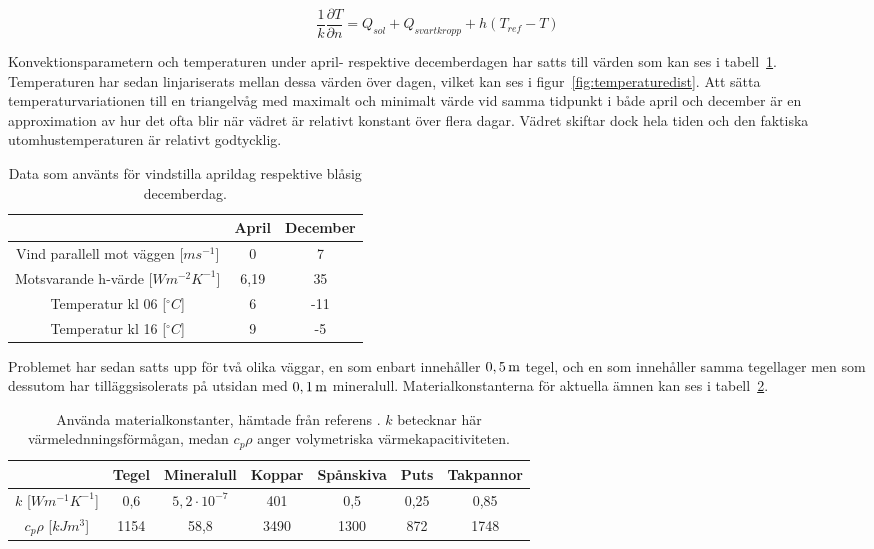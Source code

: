\begin{equation}
\label{eq:wallneumann}
\frac{1}{k}\frac{\partial T}{\partial n} = Q_{sol} + Q_{svartkropp} + h(T_{ref}-T)
\end{equation}

Konvektionsparametern och temperaturen under april- respektive decemberdagen har satts till värden som kan ses i tabell~\ref{tbl:aprdec}. Temperaturen har sedan linjariserats mellan dessa värden över dagen, vilket kan ses i figur~\ref{fig:temperaturedist}. Att sätta temperaturvariationen till en triangelvåg med maximalt och minimalt värde vid samma tidpunkt i både april och december är en approximation av hur det ofta blir när vädret är relativt konstant över flera dagar. Vädret skiftar dock hela tiden och den faktiska utomhustemperaturen är relativt godtycklig.

\begin{table}[hpbt]
\centering
\caption{Data som använts för vindstilla aprildag respektive blåsig decemberdag.}
\begin{tabular}{c|c|c}
& April & December \\
\hline
Vind parallell mot väggen [$ms^{-1}$] & 0 & 7 \\
Motsvarande h-värde [$Wm^{-2}K^{-1}$] & 6,19 & 35 \\
Temperatur kl 06 [$^{\circ}C$] & 6 & -11 \\
Temperatur kl 16 [$^{\circ}C$] & 9 & -5
\end{tabular}
\label{tbl:aprdec}
\end{table}


Problemet har sedan satts upp för två olika väggar, en som enbart innehåller $\unit[0,5]{m}$ tegel, och en som innehåller samma tegellager men som dessutom har tilläggsisolerats på utsidan med $\unit[0,1]{m}$ mineralull. Materialkonstanterna för aktuella ämnen kan ses i tabell~\ref{tbl:materialconstants}.

\begin{table}[hpbt]
\centering
\caption{Använda materialkonstanter, hämtade från referens \cite{kandidatarbete2010}\cite{engineeringtoolboxdensity}\cite{bkvthermal}\cite{engineeringtoolboxspecificheat}\cite{engineeringcom}\cite{engineeringtoolboxthermalconductivity}\cite{ozel11}. $k$ betecknar här värmelednningsförmågan, medan $c_p\rho$ anger volymetriska värmekapacitiviteten.}
\begin{tabular}{c|c|c|c|c|c|c}
& Tegel & Mineralull & Koppar & Spånskiva & Puts & Takpannor \\
\hline
$k$ [$Wm^{-1}K^{-1}$] & 0,6 & $5,2\cdot 10^{-7}$ & 401 & 0,5 & 0,25 & 0,85\\
$c_p \rho$ [$kJm^{3}$] & 1154 & 58,8 & 3490 & 1300 & 872 & 1748
\end{tabular}
\label{tbl:materialconstants}
\end{table}

